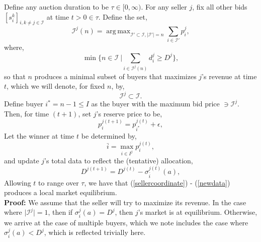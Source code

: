 \documentclass[sigconf, anonymous]{acmart}
\newcommand{\mcI}{\mathcal{I}}
\newcommand{\g}{\sigma}
\DeclareMathOperator*{\argmax}{arg\,max}
\theoremstyle{definition}
\begin{document}
{
\label{sellerstrategy}
Define any auction duration to be $\tau \in [0,\infty)$. 
For any seller $j$, fix all other bids $[s_i^k]_{i,k\ne j \in\mcI}$ at time $t>0\in\tau$.
Define the set,
$$
    \mcI^j(n) =\argmax_{{\mcI}' \subset \mcI, \vert{\mcI}'\vert =
n}\sum_{i\in{\mcI}'} p_i^j,
$$
where,
\begin{equation}\label{sellercoordinate}
    \min\bigg\lbrace n \in\mcI \ \bigg\vert\displaystyle\sum_{i\in\mcI^j(n)}d_i^j
\ge D^j \bigg\rbrace,
\end{equation} 
so that $n$ produces a minimal subset 
of buyers that maximizes $j$'s revenue at time $t$, which we will
denote, for fixed $n$, by,
\begin{equation}\label{buyers}
    \mcI^j \subset \mcI.
\end{equation} 
Define buyer $i^* = n-1 \le I$ as the buyer with the maximum bid price $\ni
\mcI^j$.
Then, for time $(t+1)$, set $j$'s reserve price to be, 
\begin{equation}\label{newprice}
    p_i^{j(t+1)} = p_{i^*}^{j(t)} + \epsilon,
\end{equation}
Let the winner at time $t$ be determined by,
\begin{equation}\label{winner}
    \bar{i} = \displaystyle\max_{i\in I^j} p_i^{j(t)},
\end{equation}
and update $j$'s total data to reflect the (tentative) allocation,
\begin{equation}\label{newdata}
    D^{j(t+1)} = D^{j(t)} - \g_{\bar{i}}^{j(t)}(a),
\end{equation}
Allowing $t$ to range over $\tau$, we have that (\ref{sellercoordinate}) -
(\ref{newdata}) produces a local market equilibrium. 
}\\
\textbf{Proof:}
We assume that the seller will try to maximize its revenue. In the case where
$\vert\mcI^j\vert =1$, then if $\g_i^j(a)=D^j$, then $j$'s market is at equilibrium.
Otherwise, we arrive at the case of multiple buyers, which we note includes the
case where $\g_i^j(a) < D^j$, which is reflected trivially here.
\end{document}
